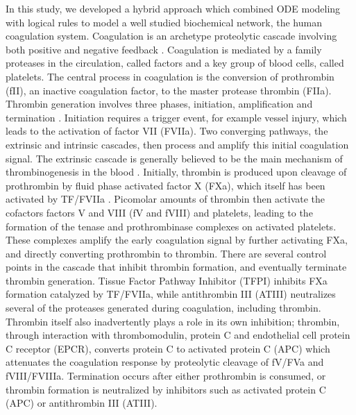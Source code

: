 \documentclass[12pt]{article}
\begin{document}
In this study, we developed a hybrid approach which combined ODE modeling with logical rules to model a well studied biochemical network, 
the human coagulation system. Coagulation is an archetype proteolytic cascade involving both positive 
and negative feedback \cite{Butenas:2002aa,Schenone:2004aa,Adams:2009aa}. 
Coagulation is mediated by a family proteases in the circulation, called factors and a key group of blood cells, called platelets. 
The central process in coagulation is the conversion of prothrombin (fII), an inactive coagulation factor, to the master protease thrombin (FIIa).
Thrombin generation involves three phases, initiation, amplification and termination \cite{GOLDHABER2006, Brummel:2002aa}.
Initiation requires a trigger event, for example vessel injury, which leads to the activation of factor VII (FVIIa).
Two converging pathways, the extrinsic and intrinsic cascades, then process and amplify this initial coagulation signal. 
The extrinsic cascade is generally believed to be the main mechanism of thrombinogenesis in the blood \cite{MANN1990,ROBERTS1998,MANN1999}.
Initially, thrombin is produced upon cleavage of prothrombin by fluid phase activated factor X (FXa), which itself has been activated by TF/FVIIa \cite{Butenas:2002aa}. 
Picomolar amounts of thrombin then activate the cofactors factors V and VIII (fV and fVIII) and platelets, 
leading to the formation of the tenase and prothrombinase complexes on activated platelets.
These complexes amplify the early coagulation signal by further activating FXa, and directly converting prothrombin to thrombin. 
There are several control points in the cascade that inhibit thrombin formation, and eventually terminate thrombin generation. 
Tissue Factor Pathway Inhibitor (TFPI) inhibits FXa formation catalyzed by TF/FVIIa, while antithrombin III (ATIII)
neutralizes several of the proteases generated during coagulation, including thrombin.  
Thrombin itself also inadvertently plays a role in its own inhibition; thrombin, through interaction with thrombomodulin, protein C and endothelial cell protein C receptor (EPCR),
converts protein C to activated protein C (APC) which attenuates the coagulation response by proteolytic cleavage of fV/FVa and fVIII/FVIIIa. 
Termination occurs after either prothrombin is consumed, or thrombin formation is neutralized by inhibitors such as activated protein C (APC) or antithrombin III (ATIII).   
\end{document}
